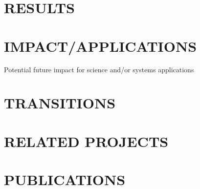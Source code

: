 \documentclass{onrannual}
\begin{document}
\section{RESULTS}

\section{IMPACT/APPLICATIONS}
Potential future impact for science and/or systems applications

\section{TRANSITIONS}

\section{RELATED PROJECTS}

\section{PUBLICATIONS}
\end{document}
